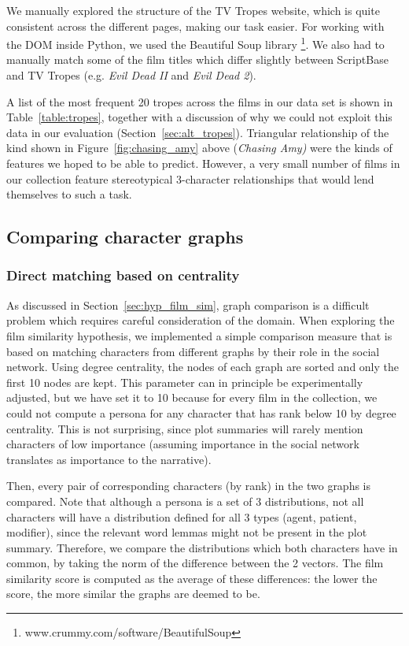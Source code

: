 \documentclass[bsc,frontabs,singlespacing,parskip, twoside]{infthesis}
\begin{document}
We manually explored the structure of the TV Tropes website, which is quite consistent across the different pages, making our task easier. For working with the DOM inside Python, we used the Beautiful Soup library \footnote{www.crummy.com/software/BeautifulSoup}. We also had to manually match some of the film titles which differ slightly between ScriptBase and TV Tropes (e.g. \textit{Evil Dead II} and \textit{Evil Dead 2}).

A list of the most frequent 20 tropes across the films in our data set is shown in Table~\ref{table:tropes}, together with a discussion of why we could not exploit this data in our evaluation (Section~\ref{sec:alt_tropes}). Triangular relationship of the kind shown in Figure~\ref{fig:chasing_amy} above (\textit{Chasing Amy)} were the kinds of features we hoped to be able to predict. However, a very small number of films in our collection feature stereotypical 3-character relationships that would lend themselves to such a task.

\subsection{Comparing character graphs}
\label{sec:test_film_sim}

\subsubsection{Direct matching based on centrality}
As discussed in Section~\ref{sec:hyp_film_sim}, graph comparison is a difficult problem which requires careful consideration of the domain. When exploring the film similarity hypothesis, we implemented a simple comparison measure that is based on matching characters from different graphs by their role in the social network. Using degree centrality, the nodes of each graph are sorted and only the first 10 nodes are kept. This parameter can in principle be experimentally adjusted, but we have set it to 10 because for every film in the collection, we could not compute a persona for any character that has rank below 10 by degree centrality. This is not surprising, since plot summaries will rarely mention characters of low importance (assuming importance in the social network translates as importance to the narrative).

Then, every pair of corresponding characters (by rank) in the two graphs is compared. Note that although a persona is a set of 3 distributions, not all characters will have a distribution defined for all 3 types (agent, patient, modifier), since the relevant word lemmas might not be present in the plot summary. Therefore, we compare the distributions which both characters have in common, by taking the norm of the difference between the 2 vectors. The film similarity score is computed as the average of these differences: the lower the score, the more similar the graphs are deemed to be.
\end{document}
